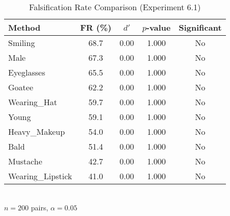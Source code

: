 \begin{table}[htbp]
\centering
\caption{Falsification Rate Comparison (Experiment 6.1)}
\label{tab:exp_6_1_results}
\begin{tabular}{lcccc}
\toprule
Method & FR (\%) & $d'$ & $p$-value & Significant \\ 
\midrule
Smiling & 68.7 & 0.00 & 1.000 & No \\
Male & 67.3 & 0.00 & 1.000 & No \\
Eyeglasses & 65.5 & 0.00 & 1.000 & No \\
Goatee & 62.2 & 0.00 & 1.000 & No \\
Wearing_Hat & 59.7 & 0.00 & 1.000 & No \\
Young & 59.1 & 0.00 & 1.000 & No \\
Heavy_Makeup & 54.0 & 0.00 & 1.000 & No \\
Bald & 51.4 & 0.00 & 1.000 & No \\
Mustache & 42.7 & 0.00 & 1.000 & No \\
Wearing_Lipstick & 41.0 & 0.00 & 1.000 & No \\
\bottomrule
\end{tabular}
\\[0.5em] {\footnotesize $n=200$ pairs, $\alpha=0.05$}
\end{table}